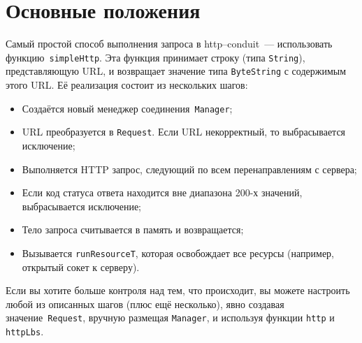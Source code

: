 \section{Основные положения}
Самый простой способ выполнения запроса в http--conduit~--- использовать
функцию~\lstinline!simpleHttp!. Эта функция принимает строку
(типа \lstinline!String!), представляющую URL, и возвращает
значение типа \lstinline!ByteString! с содержимым этого URL. Её реализация
состоит из нескольких шагов:
\begin{itemize}
\item Создаётся новый менеджер соединения~\lstinline!Manager!;
\item URL преобразуется в \lstinline!Request!. Если URL некорректный,
  то выбрасывается исключение;
\item Выполняется HTTP запрос, следующий по всем перенаправлениям с сервера;
\item Если код статуса ответа находится вне диапазона 200-х значений,
  выбрасывается исключение;
\item Тело запроса считывается в память и возвращается;
\item Вызывается \lstinline!runResourceT!, которая освобождает все
  ресурсы (например, открытый сокет к серверу).
\end{itemize}

Если вы хотите больше контроля над тем, что происходит, вы можете
настроить любой из описанных шагов (плюс ещё несколько), явно создавая
значение~\lstinline!Request!, вручную размещая \lstinline!Manager!, и
используя функции \lstinline!http! и \lstinline!httpLbs!.

